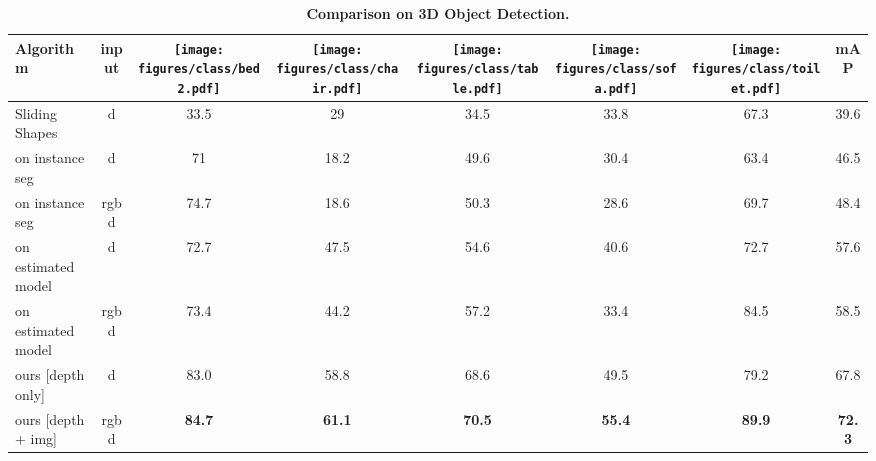 \documentclass[10pt,twocolumn,letterpaper]{article}
\begin{document}
\begin{table}[t]
\vspace{-1mm}
\centering
\setlength{\tabcolsep}{3pt}
\footnotesize
\begin{tabular}{l|c|c|c|c|c|c|c}
\hline 
Algorithm &  input
& \texttt{[image: figures/class/bed2.pdf]} 
& \texttt{[image: figures/class/chair.pdf]} 
& \texttt{[image: figures/class/table.pdf]} 
& \texttt{[image: figures/class/sofa.pdf]} 
& \texttt{[image: figures/class/toilet.pdf]} 

& mAP\tabularnewline
\hline 
Sliding Shapes \cite{SlidingShapes}  & d & 33.5 & 29 & 34.5 & 33.8 & 67.3 & 39.6\tabularnewline
\hline 
\cite{guptaCVPR15} on instance seg& d & 71 & 18.2 & 49.6 & 30.4 & 63.4 & 46.5\tabularnewline
\cite{guptaCVPR15} on instance seg & rgbd & 74.7 & 18.6 & 50.3 & 28.6 & 69.7 & 48.4\tabularnewline
\cite{guptaCVPR15} on estimated model & d & 72.7 & 47.5 & 54.6 & 40.6 & 72.7 & 57.6\tabularnewline
\cite{guptaCVPR15} on estimated model & rgbd & 73.4 & 44.2 & 57.2 & 33.4 & 84.5 & 58.5\tabularnewline
\hline 
ours  {[}depth only{]} & d & 83.0 & 58.8 & 68.6 & 49.5 & 79.2 & 67.8\tabularnewline
ours {[}depth + img{]} & rgbd & {\bf 84.7} & {\bf  61.1} & {\bf 70.5} & {\bf 55.4} & {\bf 89.9} & {\bf 72.3}\tabularnewline
\hline 
\end{tabular}
\vspace{-1mm}
\caption{{\bf Comparison on 3D Object Detection.}}
\label{fig:3ddetection}
\vspace{-5mm}
\end{table}
\end{document}
